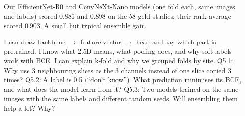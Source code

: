 \begin{innumbers}
Our EfficientNet-B0 and ConvNeXt-Nano models (one fold each, same images and labels) scored 0.886 and 0.898 on
the 58 gold studies; their rank average scored 0.903. A small but typical ensemble gain.
\end{innumbers}

\begin{checkpoint}
\begin{itemize}
\done I can draw backbone $\rightarrow$ feature vector $\rightarrow$ head and say which part is pretrained.
\done I know what 2.5D means, what pooling does, and why soft labels work with BCE.
\done I can explain k-fold and why we grouped folds by site.
\quiz Q5.1: Why use 3 neighbouring slices as the 3 channels instead of one slice copied 3 times?
\quiz Q5.2: A label is 0.5 (``don't know''). What prediction minimises its BCE, and what does the model learn from it?
\quiz Q5.3: Two models trained on the same images with the same labels and different random seeds. Will
      ensembling them help a lot? Why?
\end{itemize}
\end{checkpoint}
